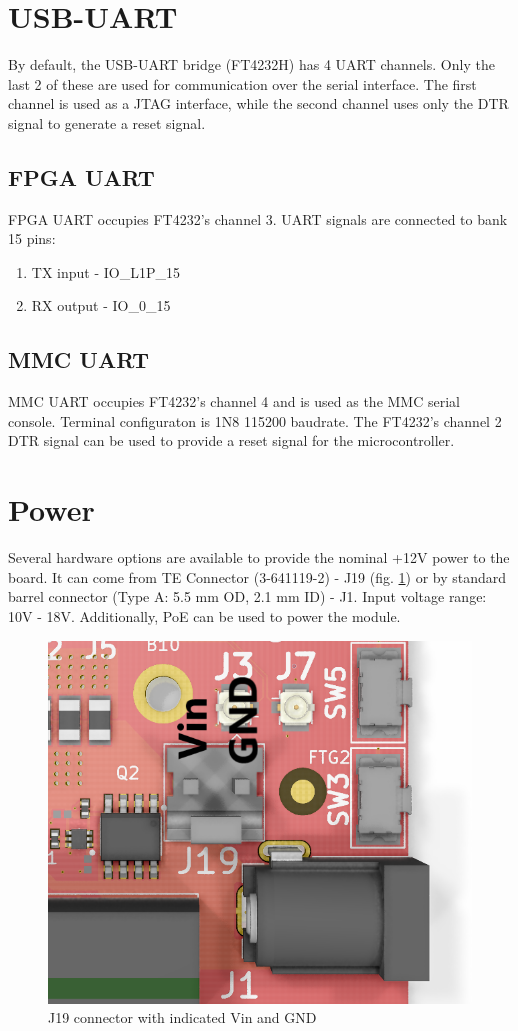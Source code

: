 \documentclass[12pt,oneside,a4]{article}
\begin{document}
\section{USB-UART}
By default, the USB-UART bridge (FT4232H) has 4 UART channels. Only the last 2 of these are used for communication over the serial interface. The first channel is used as a JTAG interface, while the second channel uses only the DTR signal to generate a reset signal.
\subsection{FPGA UART}
FPGA UART occupies FT4232's channel 3. UART signals are connected to bank 15 pins:
\begin{enumerate}
	\item TX input - IO\_L1P\_15
	\item RX output - IO\_0\_15
\end{enumerate}
\subsection{MMC UART}
MMC UART occupies FT4232's channel 4 and is used as the MMC serial console. Terminal configuraton is 1N8 115200 baudrate. The FT4232's channel 2 DTR signal can be used to provide a reset signal for the microcontroller.


\section{Power}
Several hardware options are available to provide the nominal +12V power to the board.
It can come from TE Connector (3-641119-2) - J19 (fig. \ref{j19}) or by standard barrel connector (Type A: 5.5 mm OD, 2.1 mm ID) - J1. Input voltage range: 10V - 18V. Additionally, PoE can be used to power the module.

\begin{figure}[H]
\begin{center}
\includegraphics[width=0.6\linewidth]{j1j19.png}
 \caption{J19 connector with indicated Vin and GND}\label{j19}
\end{center}
\end{figure}
\end{document}
